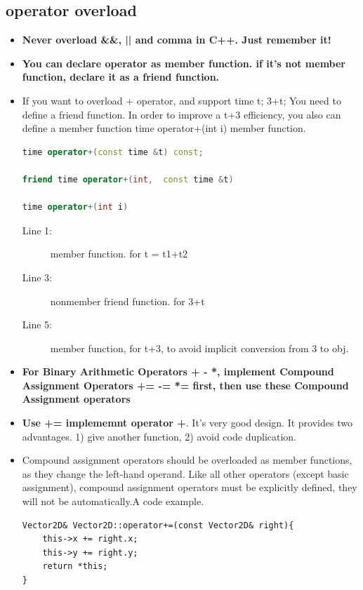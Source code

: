\documentclass[a4paper,11pt,twoside]{book}
\begin{document}
\subsection{operator overload}
\begin{itemize}
	\item \textbf{Never overload \&\&, || and comma in C++.  Just remember it!}
	
	\item \textbf{You can declare operator as member function. if it's not member function, declare it as a friend function.}
	
		\item If you want to overload + operator, and support time t; 3+t;   You need to define a friend function. In order to improve a t+3 efficiency, you also can define a member function time operator+(int i) member function.
\begin{lstlisting}[frame=single, language=c++]
time operator+(const time &t) const;

friend time operator+(int,  const time &t)

time operator+(int i)
\end{lstlisting}
\begin{description}
	\item[Line 1:] member function. for t = t1+t2
	\item[Line 3:] nonmember friend function. for 3+t
	\item[Line 5:] member function, for t+3, to avoid implicit conversion from 3 to obj.
\end{description}
	
	\item \textbf{For Binary Arithmetic Operators + - *, implement Compound Assignment Operators += -= *= first, then use these Compound Assignment operators}
	
	\item \textbf{Use += implememnt operator +}. It's very good design. It provides two advantages. 1) give another function, 2) avoid code duplication. 
	
	\item Compound assignment operators should be overloaded as member functions, as they change the left-hand operand. Like all other operators (except basic assignment), compound assignment operators must be explicitly defined, they will not be automatically.A code example. 
\begin{lstlisting}[numbers=none]
Vector2D& Vector2D::operator+=(const Vector2D& right){
	this->x += right.x;
	this->y += right.y;
	return *this;
}
\end{lstlisting}
	

\end{itemize}
\end{document}
